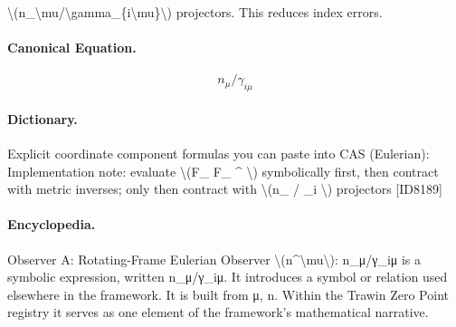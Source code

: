 \textbackslash{}(n\_\textbackslash{}mu/\textbackslash{}gamma\_\{i\textbackslash{}mu\}\textbackslash{}) projectors. This reduces index errors.

\paragraph{Canonical Equation.}
\[
n_\mu/\gamma_{i\mu}
\]

\paragraph{Dictionary.}
Explicit coordinate component formulas you can paste into CAS (Eulerian): Implementation note: evaluate \textbackslash{}(F\_ F\_ \textasciicircum{} \textbackslash{}) symbolically first, then contract with metric inverses; only then contract with \textbackslash{}(n\_ / \_i \textbackslash{}) projectors [ID8189]

\paragraph{Encyclopedia.}
Observer A: Rotating-Frame Eulerian Observer \textbackslash{}(n\textasciicircum{}\textbackslash{}mu\textbackslash{}): n\_μ/γ\_iμ is a symbolic expression, written n\_μ/γ\_iμ. It introduces a symbol or relation used elsewhere in the framework. It is built from μ, n. Within the Trawin Zero Point registry it serves as one element of the framework's mathematical narrative.

